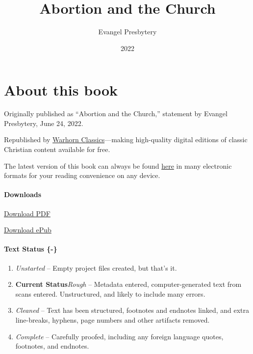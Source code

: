 \documentclass[
]{book}
\title{Abortion and the Church}
\author{Evangel Presbytery}
\date{2022}
\providecommand{\tightlist}{%
  \setlength{\itemsep}{0pt}\setlength{\parskip}{0pt}}
\begin{document}
\maketitle

\mainmatter
{}

{
\setcounter{tocdepth}{1}
\tableofcontents
}
\hypertarget{about-this-book}{%
\chapter*{About this book}\label{about-this-book}}

Originally published as ``Abortion and the Church,'' statement by Evangel Presbytery, June 24, 2022.

Republished by \href{https://classics.warhornmedia.com/}{Warhorn Classics}---making high-quality digital editions of classic Christian content available for free.

The latest version of this book can always be found \href{https://abortion.evangelpresbytery.com/}{here} in many electronic formats for your reading convenience on any device.

\hypertarget{downloads}{%
\subsubsection*{Downloads}\label{downloads}}

\href{https://abortion.evangelpresbytery.com//Abortion_and_the_Church.pdf}{Download PDF}

\href{https://abortion.evangelpresbytery.com//Abortion_and_the_Church.epub}{Download ePub}

\hypertarget{text-status--}{%
\subsubsection{Text Status \{-\}}\label{text-status--}}

\begin{enumerate}
\def\labelenumi{\arabic{enumi}.}
\setcounter{enumi}{-1}
\tightlist
\item
  \emph{Unstarted} -- Empty project files created, but that's it.
\item
  \textbf{Current Status}\emph{Rough} -- Metadata entered, computer-generated text from scans entered. Unstructured, and likely to include many errors.
\item
  \emph{Cleaned} -- Text has been structured, footnotes and endnotes linked, and extra line-breaks, hyphens, page numbers and other artifacts removed.
\item
  \emph{Complete} -- Carefully proofed, including any foreign language quotes, footnotes, and endnotes.
\end{enumerate}
\end{document}
